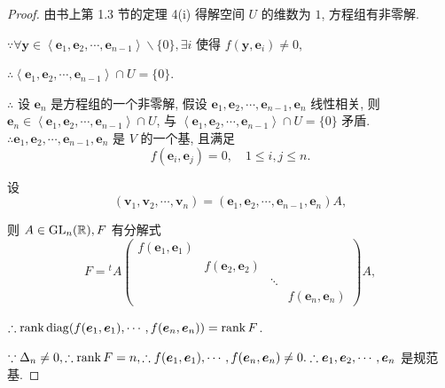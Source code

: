\documentclass{ctexart}
\begin{document}
\begin{proof}
    由书上第 1.3 节的定理 4(i) 得解空间 $U$ 的维数为 $1$, 方程组有非零解.

    $\because\forall\boldsymbol{y}\in\left<\boldsymbol{e}_1,\boldsymbol{e}_2,\cdots,\boldsymbol{e}_{n-1}\right>\backslash\{0\},\exists i$ 使得 $f(\boldsymbol{y},\boldsymbol{e}_i)\neq0$,
    
    $\therefore\left<\boldsymbol{e}_1,\boldsymbol{e}_2,\cdots,\boldsymbol{e}_{n-1}\right>\cap U=\{0\}$.

    $\therefore$ 设 $\boldsymbol{e}_n$ 是方程组的一个非零解, 假设 $\boldsymbol{e}_1,\boldsymbol{e}_2,\cdots,\boldsymbol{e}_{n-1},\boldsymbol{e}_n$ 线性相关, 则 $\boldsymbol{e}_n\in\left<\boldsymbol{e}_1,\boldsymbol{e}_2,\cdots,\boldsymbol{e}_{n-1}\right>\cap U$, 与 $\left<\boldsymbol{e}_1,\boldsymbol{e}_2,\cdots,\boldsymbol{e}_{n-1}\right>\cap U=\{0\}$ 矛盾. $\therefore\boldsymbol{e}_1,\boldsymbol{e}_2,\cdots,\boldsymbol{e}_{n-1},\boldsymbol{e}_n$ 是 $V$ 的一个基, 且满足
    \[f(\boldsymbol{e}_i,\boldsymbol{e}_j)=0,\quad1\leq i,j\leq n.\]
    
    设
    \[(\boldsymbol{v}_1,\boldsymbol{v}_2,\cdots,\boldsymbol{v}_n)=(\boldsymbol{e}_1,\boldsymbol{e}_2,\cdots,\boldsymbol{e}_{n-1},\boldsymbol{e}_n)A,\]

    则 $A\in\operatorname{GL} _n(\mathbb{R}),F$ 有分解式
    \begin{equation}\label{eq3.3}
        F={}^tA\begin{pmatrix}
            f(\boldsymbol{e}_1,\boldsymbol{e}_1) \\
            & f(\boldsymbol{e}_2,\boldsymbol{e}_2) \\
            && \ddots \\
            &&& f(\boldsymbol{e}_n,\boldsymbol{e}_n)
        \end{pmatrix}A,
    \end{equation}

    $\therefore\operatorname{rank} \operatorname{diag} (f(\boldsymbol{e}_1,\boldsymbol{e}_1),\cdots,f(\boldsymbol{e}_n,\boldsymbol{e}_n))=\operatorname{rank} F$.

    $\because\Delta_n\neq0,\therefore\operatorname{rank} F=n,\therefore f(\boldsymbol{e}_1,\boldsymbol{e}_1),\cdots,f(\boldsymbol{e}_n,\boldsymbol{e}_n)\neq0.\therefore\boldsymbol{e}_1,\boldsymbol{e}_2,\cdots,\boldsymbol{e}_n$ 是规范基.


\end{proof}
\end{document}
